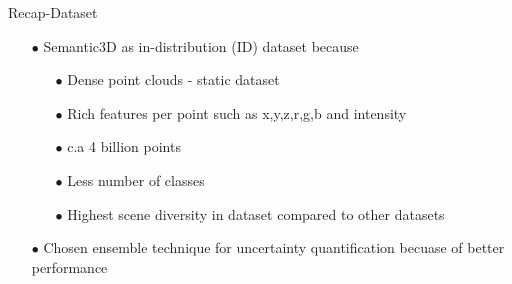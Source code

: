 \documentclass[aspectratio=169]{beamer}
\begin{document}
\begin{frame}{Recap-Dataset}
    \begin{itemize}
        \item[$\bullet$] Semantic3D as in-distribution (ID) dataset because
        \begin{itemize}
            \item[$\bullet$] Dense point clouds - static dataset
            \item[$\bullet$] Rich features per point such as x,y,z,r,g,b and intensity 
            \item[$\bullet$] c.a 4 billion points
            \item[$\bullet$] Less number of classes
            \item[$\bullet$] Highest scene diversity in dataset compared to other datasets
        \end{itemize} 
        \item[$\bullet$] Chosen ensemble technique for uncertainty quantification becuase of better performance  
    \end{itemize}
\end{frame}
\end{document}
